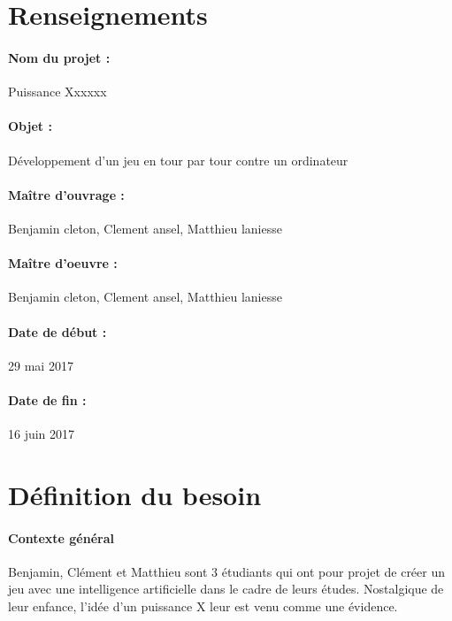 \documentclass[a4paper,oneside]{article}
\title{\mytitle }
\author{Ginette et Roger}
\date{1\ier~juin 2015}
\begin{document}
\maketitle

\thispagestyle{fancyplain}



\section{Renseignements}

\paragraph{Nom du projet :}
Puissance Xxxxxx

\paragraph{Objet :}
Développement d'un jeu en tour par tour contre un ordinateur

\paragraph{Maître d'ouvrage :}
Benjamin cleton, Clement ansel, Matthieu laniesse

\paragraph{Maître d'oeuvre : }
Benjamin cleton, Clement ansel, Matthieu laniesse

\paragraph{Date de début :}
29 mai 2017

\paragraph{Date de fin :}
16 juin 2017



\newpage

\section{Définition du besoin}

\paragraph{Contexte général\\}
Benjamin, Clément et Matthieu sont 3 étudiants qui ont pour projet de créer un jeu avec une intelligence artificielle dans le cadre de leurs études.
Nostalgique de leur enfance, l'idée d'un puissance X leur est venu comme une évidence.
\end{document}
